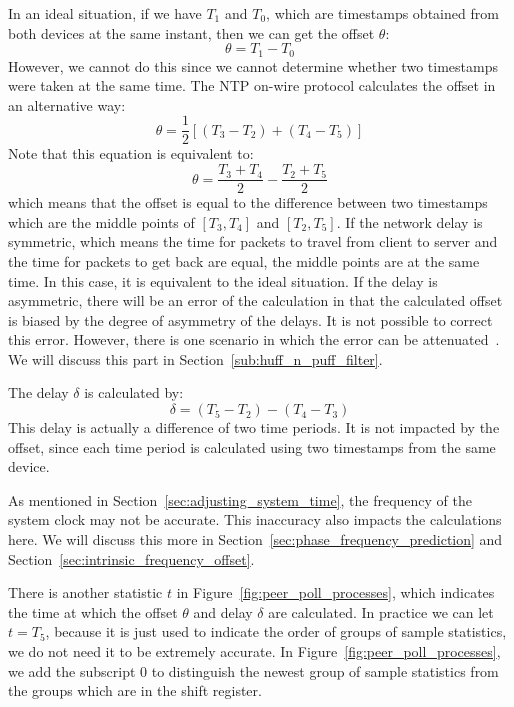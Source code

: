 In an ideal situation, if we have $T_1$ and $T_0$, which are timestamps
obtained from both devices at the same instant, then we can get the offset
$\theta$:
$$\theta = T_1 - T_0$$
However, we cannot do this since we cannot determine whether two timestamps
were taken at the same time. The NTP on-wire protocol calculates the
offset in an alternative way:
\begin{equation}
    \theta = \frac{1}{2}\left[(T_3 - T_2) + (T_4 - T_5)\right]
    \label{eq:offset_def}
\end{equation}
Note that this equation is equivalent to:
$$\theta = \frac{T_3 + T_4}{2} - \frac{T_2 + T_5}{2}$$
which means that the offset is equal to the difference between two timestamps
which are the middle points of $[T_3, T_4]$ and $[T_2, T_5]$. 
If the network delay is symmetric, which means the time for packets to travel
from client to server and the time for packets to get back are equal, the
middle points are at the same time. In this case, it is equivalent to the ideal
situation. If the delay is asymmetric, there will be an error of the
calculation in that the calculated offset is biased by the degree of asymmetry
of the delays. It is not possible to correct this error. However, there is one
scenario in which the error can be attenuated~\cite{redbook}. We will discuss this
part in Section~\ref{sub:huff_n_puff_filter}.

The delay $\delta$ is calculated by:
\begin{equation}
    \delta = (T_5 - T_2) - (T_4 - T_3)
    \label{eq:delay_def}
\end{equation}
This delay is actually a difference of two time periods. It is not impacted by
the offset, since each time period is calculated using two timestamps from the
same device. 

As mentioned in Section~\ref{sec:adjusting_system_time}, the frequency of 
the system clock may not be accurate. This inaccuracy also impacts the
calculations here. We will discuss this more in
Section~\ref{sec:phase_frequency_prediction} and
Section~\ref{sec:intrinsic_frequency_offset}.

There is another statistic $t$ in Figure~\ref{fig:peer_poll_processes}, which
indicates the time at which the offset $\theta$ and delay $\delta$ are
calculated.  In practice we can let $t = T_5$, because it is just used to
indicate the order of groups of sample statistics, we do not need it to be
extremely accurate.  In Figure~\ref{fig:peer_poll_processes}, we add the
subscript 0 to distinguish the newest group of sample statistics from the
groups which are in the shift register.

